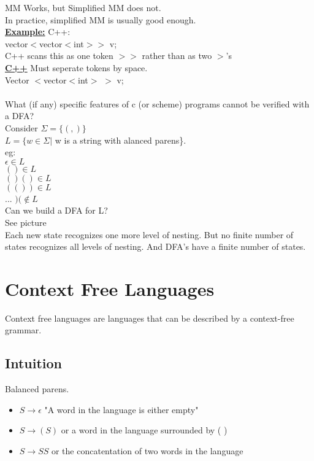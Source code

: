 \documentclass[12pt]{article}
\newcommand{\myt}[1]{\textbf{\underline{#1}}}
\begin{document}
	 MM Works, but Simplified MM does not.\\
	 
	 In practice, simplified MM is usually good enough.\\
	 
	 \myt{Example:} C++:\\
	 vector$<$vector$<$int$>>$ v;\\
	 C++ scans this as one token $>>$ rather than as two $>$'s\\
	 
	 \myt{C++}
	 Must seperate tokens by space.\\
	 Vector $<$vector$<$int$>$ $>$ v;\\
	
	\hrulefill\\
	
	What (if any) specific features of c (or scheme) programs cannot be verified with a DFA?\\
	
	Consider $\Sigma = \{(,)\}$\\
	$L = \{w \in \Sigma |$ w is a string with alanced parens\}.\\
	eg:\\
	$\epsilon \in L$\\
	$() \in L$\\
	$()() \in L$\\
	$(()) \in L$\\
	...
	$)( \notin L$\\
	
	Can we build a DFA for L?\\
	
	See picture\\
	
	Each new state recognizes one more level of nesting. But no finite number of states recognizes all levels of nesting. And DFA's have a finite number of states.\\
	
	\section*{Context Free Languages}
	Context free languages are languages that can be described by a context-free grammar.\\
	
	\subsection*{Intuition}
	Balanced parens.\\
	\begin{itemize}
		\item $S \rightarrow \epsilon$ "A word in the language is either empty"
		\item $S \rightarrow (S)$ or a word in the language surrounded by ( )
		\item $S \rightarrow SS$ or the concatentation of two words in the language
	\end{itemize}
	
\end{document}

